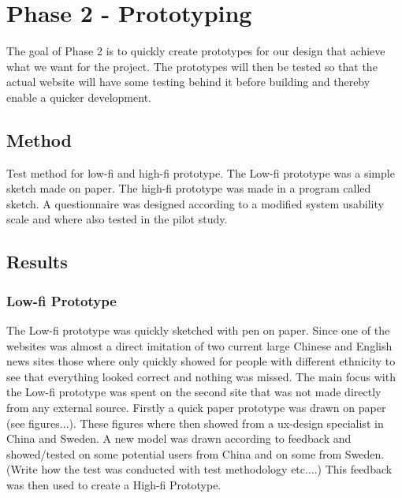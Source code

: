 
\chapter{Phase 2 - Prototyping} %

\label{Chapter5} %

The goal of Phase 2 is to quickly create prototypes for our design that achieve what we want for the project. The prototypes will then be tested so that the actual website will have some testing behind it before building and thereby enable a quicker development.

\section{Method}
Test method for low-fi and high-fi prototype. The Low-fi prototype was a simple sketch made on paper. The high-fi prototype was made in a program called sketch. A questionnaire was designed according to a modified system usability scale and where also tested in the pilot study. 


\section{Results}
\subsection{Low-fi Prototype}
The Low-fi prototype was quickly sketched with pen on paper. Since one of the websites was almost a direct imitation of two current large Chinese and English news sites those where only quickly showed for people with different ethnicity to see that everything looked correct and nothing was missed. The main focus with the Low-fi prototype was spent on the second site that was not made directly from any external source. Firstly a quick paper prototype was drawn on paper  (see figures...). These figures where then showed from a ux-design specialist in China and Sweden. A new model was drawn according to feedback and showed/tested on some potential users from China and on some from Sweden. (Write how the test was conducted with test methodology etc....) This feedback was then used to create a High-fi Prototype.

